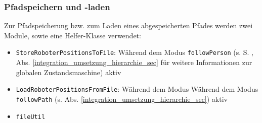 

\subsubsection{Pfadspeichern und -laden}
\label{bahnplanung_pfadSpeichernLaden_subsubsec}


Zur Pfadspeicherung bzw. zum Laden eines abgespeicherten Pfades werden zwei Module, sowie eine Helfer-Klasse verwendet:
\begin{itemize}
	\item \lstinline{StoreRoboterPositionsToFile}: Während dem Modus \lstinline{followPerson} (s. S. \pageref{integration_umsetzung_hierarchie_sec}, Abs. \ref{integration_umsetzung_hierarchie_sec} für weitere Informationen zur globalen Zustandsmaschine) aktiv
	\item \lstinline{LoadRoboterPositionsFromFile}: Während dem Modus Während dem Modus \lstinline{followPath} (s. Abs. \ref{integration_umsetzung_hierarchie_sec}) aktiv
	\item \lstinline{fileUtil}
\end{itemize}

